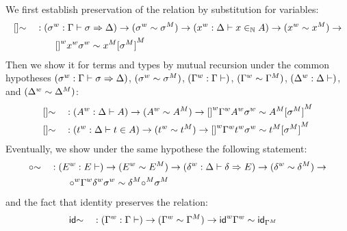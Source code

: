 We first establish preservation of the relation by substitution for variables:
\begin{alignat*}{5}
  & []{\sim} && :
  ({\sigma}^w : \Gamma \vdash \sigma \Rightarrow \Delta) \rightarrow
  ({\sigma}^w \sim {\sigma}^M) \rightarrow
  ({x}^w : \Delta \vdash x \in_{\mathbb{N}} A) \rightarrow
  ({x}^w \sim {x}^M) \rightarrow
  \\ & && \qquad
   {[]}^w{x}^w{\sigma}^w \sim {x}^M{[{\sigma}^M]}^M
\end{alignat*}
Then we show it for terms and types  by mutual recursion
under the common hypotheses
  $({\sigma}^w : \Gamma \vdash \sigma \Rightarrow \Delta)$,
  $({\sigma}^w \sim {\sigma}^M)$,
  $({\Gamma}^w : \Gamma \vdash )$,
  $({\Gamma}^w \sim {\Gamma}^M)$,
    $({\Delta}^w : \Delta \vdash )$,
    and
  $({\Delta}^w \sim {\Delta}^M)$:
\begin{alignat*}{5}
     & []{\sim} && :
    ({A}^w : \Delta \vdash A) \rightarrow
  ({A}^w \sim {A}^M) \rightarrow
   {[]}^w{\Gamma}^w{A}^w{\sigma}^w \sim {A}^M{[{\sigma}^M]}^M
   \\
     & []{\sim} && :
    ({t}^w : \Delta \vdash t \in A ) \rightarrow
  ({t}^w \sim {t}^M) \rightarrow
   {[]}^w{\Gamma}^w{t}^w{\sigma}^w \sim {t}^M{[{\sigma}^M]}^M
  \end{alignat*}
  Eventually, we show under the same hypothese the following statement:
  \begin{alignat*}{5}
     & {\circ}{\sim} && :
    ({E}^w : E \vdash ) \rightarrow
  ({E}^w \sim {E}^M) \rightarrow
    ({\delta}^w : \Delta \vdash \delta \Rightarrow E) \rightarrow
  ({\delta}^w \sim {\delta}^M) \rightarrow
  \\
  & && \qquad
   {{\circ}}^w{\Gamma}^w{\delta}^w{\sigma}^w \sim {\delta}^M{\circ}^M{\sigma}^M
  \end{alignat*}
  and the fact that identity preserves the relation:
  \begin{alignat*}{5}
     & {\mathsf{id}}{\sim} && :
    ({\Gamma}^w : \Gamma \vdash ) \rightarrow
  ({\Gamma}^w \sim {\Gamma}^M) \rightarrow
   {{\mathsf{id}}}^w{\Gamma}^w \sim {\mathsf{id}}_{{\Gamma}^M}
  \end{alignat*}


